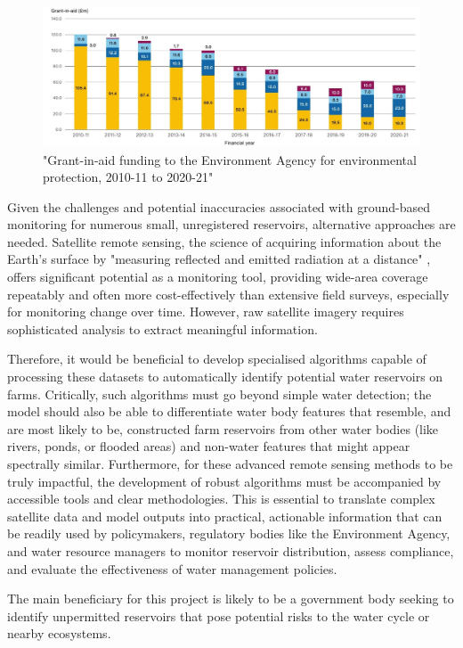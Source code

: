 \begin{figure}[ht]
    \centering
    \includegraphics[width=0.5\linewidth]{contents/figures/intro-environment agency funding.jpg}
    \caption{"Grant-in-aid funding to the Environment Agency for environmental protection, 2010-11 to 2020-21" \citep{comptrollerandauditorgeneral_2022}}
    \label{fig:EA funding decline}
\end{figure}

Given the challenges and potential inaccuracies associated with ground-based monitoring for numerous small, unregistered reservoirs, alternative approaches are needed. Satellite remote sensing, the science of acquiring information about the Earth's surface by "measuring reflected and emitted radiation at a distance" \citep{usgs_2022a}, offers significant potential as a monitoring tool, providing wide-area coverage repeatably and often more cost-effectively than extensive field surveys, especially for monitoring change over time. However, raw satellite imagery requires sophisticated analysis to extract meaningful information.

Therefore, it would be beneficial to develop specialised algorithms capable of processing these datasets to automatically identify potential water reservoirs on farms. Critically, such algorithms must go beyond simple water detection; the model should also be able to differentiate water body features that resemble, and are most likely to be, constructed farm reservoirs from other water bodies (like rivers, ponds, or flooded areas) and non-water features that might appear spectrally similar. Furthermore, for these advanced remote sensing methods to be truly impactful, the development of robust algorithms must be accompanied by accessible tools and clear methodologies. This is essential to translate complex satellite data and model outputs into practical, actionable information that can be readily used by policymakers, regulatory bodies like the Environment Agency, and water resource managers to monitor reservoir distribution, assess compliance, and evaluate the effectiveness of water management policies.

The main beneficiary for this project is likely to be a government body seeking to identify unpermitted reservoirs that pose potential risks to the water cycle or nearby ecosystems. 

